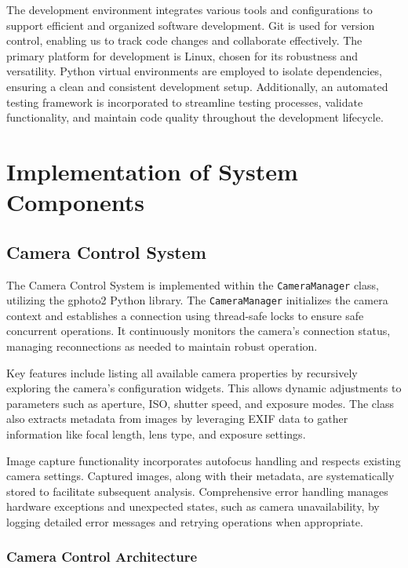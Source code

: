 The development environment integrates various tools and configurations to support efficient and organized software development. Git is used for version control, enabling us to track code changes and collaborate effectively. The primary platform for development is Linux, chosen for its robustness and versatility. Python virtual environments are employed to isolate dependencies, ensuring a clean and consistent development setup. Additionally, an automated testing framework is incorporated to streamline testing processes, validate functionality, and maintain code quality throughout the development lifecycle.

\section{Implementation of System Components}

\subsection{Camera Control System}

The Camera Control System is implemented within the \texttt{CameraManager} class, utilizing the gphoto2 Python library. The \texttt{CameraManager} initializes the camera context and establishes a connection using thread-safe locks to ensure safe concurrent operations. It continuously monitors the camera's connection status, managing reconnections as needed to maintain robust operation.

Key features include listing all available camera properties by recursively exploring the camera's configuration widgets. This allows dynamic adjustments to parameters such as aperture, ISO, shutter speed, and exposure modes. The class also extracts metadata from images by leveraging EXIF data to gather information like focal length, lens type, and exposure settings.

Image capture functionality incorporates autofocus handling and respects existing camera settings. Captured images, along with their metadata, are systematically stored to facilitate subsequent analysis. Comprehensive error handling manages hardware exceptions and unexpected states, such as camera unavailability, by logging detailed error messages and retrying operations when appropriate.

\subsubsection{Camera Control Architecture}

